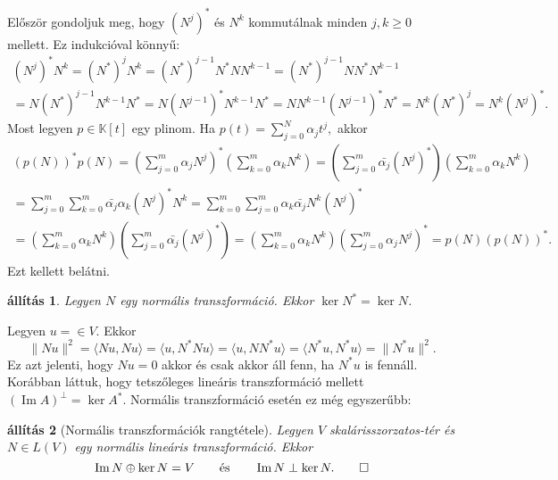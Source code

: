 \documentclass[9pt, a4paper, showtrims]{memoir}
\makeatletter
\renewenvironment{proof}[1][\proofname]
    {\par\pushQED{\qed}%
    \normalfont \topsep6\p@\@plus6\p@\relax
    \trivlist
    \item[\hskip\labelsep
        \itshape
    #1\@addpunct{:}]\ignorespaces}
    {\popQED\endtrivlist\@endpefalse}
\theoremstyle{plain}
\newtheorem{proposition}{állítás}[chapter]
\theoremstyle{remark}
\theoremstyle{definition}
\DeclareMathOperator{\im}{Im}
\newcommand{\ip}[2]{\langle#1,#2\rangle}
\makeatother
\begin{document}
\begin{proof}
    Először gondoljuk meg, hogy $(N^j)^\ast$ és $N^k$ kommutálnak minden $j,k≥0$ mellett.
    Ez indukcióval könnyű:
    \begin{multline*}
        (N^j)^\ast N^k
        =
        (N^\ast)^jN^k
        =
        (N^\ast)^{j-1}N^\ast NN^{k-1}
        =
        (N^\ast)^{j-1}NN^\ast N^{k-1}
        \\
        =
        N(N^\ast)^{j-1}N^{k-1}N^\ast
        =
        N(N^{j-1})^\ast N^{k-1}N^\ast
        =
        NN^{k-1}(N^{j-1})^\ast N^\ast
        =
        N^k(N^\ast)^j
        =
        N^k(N^j)^\ast.
    \end{multline*}
    Most legyen $p\in \mathbb{K}[t]$ egy plinom.
    Ha $p\left( t \right)=\sum_{j=0}^N\alpha_jt^j,$
    akkor
    \begin{multline*}
        \left( p\left( N \right) \right)^\ast p\left( N \right)
        =
        \left( \sum_{j=0}^m\alpha_jN^j \right)^\ast
         \left( \sum_{k=0}^m\alpha_kN^k \right)
        =
        \left( \sum_{j=0}^m\bar{\alpha_j}(N^j)^\ast \right)
        \left( \sum_{k=0}^m\alpha_kN^k \right)
        \\
        =
        \sum_{j=0}^m\sum_{k=0}^m\bar{\alpha_j}\alpha_k(N^j)^\ast N^k
        =
        \sum_{k=0}^m\sum_{j=0}^m\alpha_k\bar{\alpha_j}N^k(N^j)^\ast
        \\
        =
        \left( \sum_{k=0}^m\alpha_kN^k \right)
        \left( \sum_{j=0}^m\bar{\alpha_j}(N^j)^\ast \right)
        =
        \left( \sum_{k=0}^m\alpha_kN^k \right)
        \left( \sum_{j=0}^m\alpha_jN^j\right)^\ast
        =
        p\left( N \right)\left( p\left( N \right) \right)^\ast.
    \end{multline*}
    Ezt kellett belátni. 
\end{proof}
\begin{proposition}
    Legyen $N$ egy normális transzformáció. 
    Ekkor $\ker N^\ast=\ker N$.
\end{proposition}
\begin{proof}
    Legyen $u=\in V.$
    Ekkor 
    \[
        \|Nu\|^2
        =
        \ip{Nu}{Nu}
        =
        \ip{u}{N^\ast Nu}
        =
        \ip{u}{NN^\ast u}
        =
        \ip{N^\ast u}{N^\ast u}
        =
        \|N^\ast u\|^2.
    \]
    Ez azt jelenti, hogy $Nu=0$ akkor és csak akkor áll fenn, 
    ha $N^\ast u$ is fennáll.
\end{proof}
Korábban láttuk, 
hogy tetszőleges lineáris transzformáció mellett $(\im A)^\perp=\ker A^\ast.$
Normális transzformáció esetén ez még egyszerűbb:
\begin{proposition}[Normális transzformációk rangtétele]
    Legyen $V$ skalárisszorzatos-tér és $N\in L\left( V \right)$ egy normális lineáris transzformáció.
    Ekkor 
    \[
        \im N\oplus\ker N=V\qquad\text{és}\qquad \im N\perp \ker N.
        \qedhere
    \]
\end{proposition}
\end{document}
